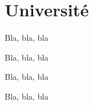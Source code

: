 \documentclass[12pt,a4paper]{article}
\begin{document}
\section{Université}

\vspace{21cm}

\begin{pseudoverb}[title = Sur deux pages, frame, width=.5, center]
Bla, bla, bla

Bla, bla, bla

Bla, bla, bla

Bla, bla, bla
\end{pseudoverb} 
\end{document}
